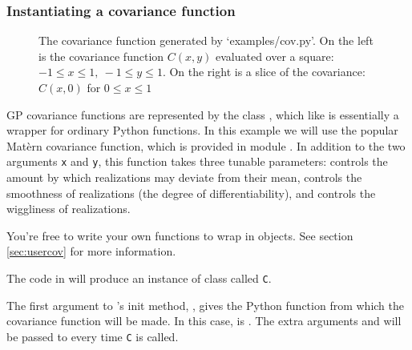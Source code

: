 \documentclass{manual}
\begin{document}
\subsubsection{Instantiating a covariance function}\label{subsub:cov}
\begin{figure}
    \centering
    \caption{The covariance function generated by {\sffamily `examples/cov.py'}. On the left is the covariance function $C(x,y)$ evaluated over a square: $-1\le x\le 1,\ -1\le y\le 1$. On the right is a slice of the covariance: $C(x,0)$ for $0\le x \le 1$}
    \label{fig:cov}
\end{figure}

GP covariance functions are represented by the class , which like  is essentially a wrapper for ordinary Python functions. In this example we will use the popular Mat\`ern covariance function, which is provided in module . In addition to the two arguments \texttt{x} and \texttt{y}, this function takes three tunable parameters:  controls the amount by which realizations may deviate from their mean,  controls the smoothness of realizations (the degree of differentiability), and  controls the wiggliness of realizations.

You're free to write your own functions to wrap in  objects. See section \ref{sec:usercov} for more information.

The code in  will produce an instance of class  called \texttt{C}.


The first argument to 's init method, , gives the Python function from which the covariance function will be made. In this case,  is . The extra arguments  and  will be passed to  every time \texttt{C} is called.
\end{document}
